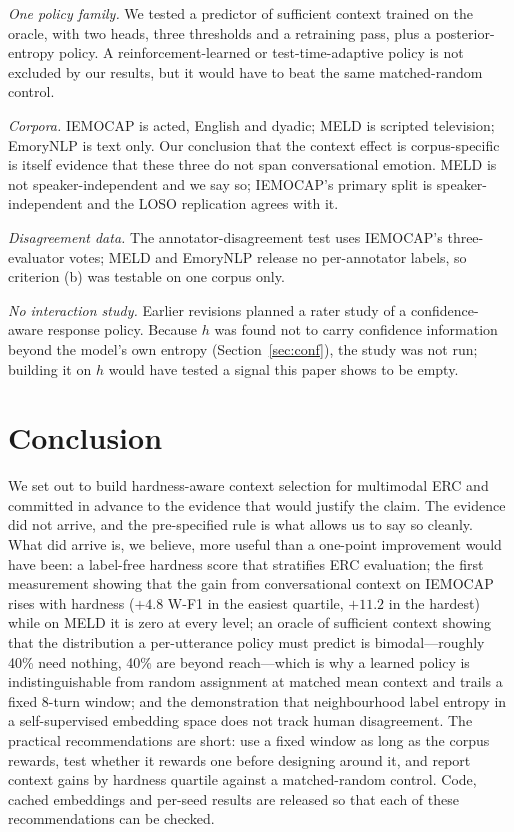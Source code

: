 \documentclass[journal]{IEEEtran}
\newcommand{\wf}{W-F1}
\begin{document}
\emph{One policy family.} We tested a predictor of sufficient context trained on the oracle, with two heads, three thresholds and a retraining pass, plus a posterior-entropy policy. A reinforcement-learned or test-time-adaptive policy is not excluded by our results, but it would have to beat the same matched-random control.

\emph{Corpora.} IEMOCAP is acted, English and dyadic; MELD is scripted television; EmoryNLP is text only. Our conclusion that the context effect is corpus-specific is itself evidence that these three do not span conversational emotion. MELD is not speaker-independent and we say so; IEMOCAP's primary split is speaker-independent and the LOSO replication agrees with it.

\emph{Disagreement data.} The annotator-disagreement test uses IEMOCAP's three-evaluator votes; MELD and EmoryNLP release no per-annotator labels, so criterion (b) was testable on one corpus only.

\emph{No interaction study.} Earlier revisions planned a rater study of a confidence-aware response policy. Because $h$ was found not to carry confidence information beyond the model's own entropy (Section~\ref{sec:conf}), the study was not run; building it on $h$ would have tested a signal this paper shows to be empty.

\section{Conclusion}\label{sec:conclusion}
We set out to build hardness-aware context selection for multimodal ERC and committed in advance to the evidence that would justify the claim. The evidence did not arrive, and the pre-specified rule is what allows us to say so cleanly. What did arrive is, we believe, more useful than a one-point improvement would have been: a label-free hardness score that stratifies ERC evaluation; the first measurement showing that the gain from conversational context on IEMOCAP rises with hardness ($+4.8$ \wf{} in the easiest quartile, $+11.2$ in the hardest) while on MELD it is zero at every level; an oracle of sufficient context showing that the distribution a per-utterance policy must predict is bimodal---roughly 40\% need nothing, 40\% are beyond reach---which is why a learned policy is indistinguishable from random assignment at matched mean context and trails a fixed 8-turn window; and the demonstration that neighbourhood label entropy in a self-supervised embedding space does not track human disagreement. The practical recommendations are short: use a fixed window as long as the corpus rewards, test whether it rewards one before designing around it, and report context gains by hardness quartile against a matched-random control. Code, cached embeddings and per-seed results are released so that each of these recommendations can be checked.
\end{document}
